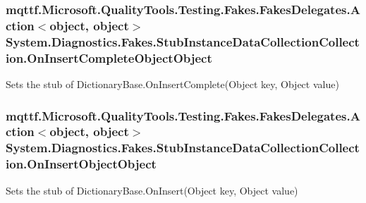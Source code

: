 \hypertarget{class_system_1_1_diagnostics_1_1_fakes_1_1_stub_instance_data_collection_collection_acc5087bdf8b7896be5e1d28d00ec22c1}{
\subsubsection[{On\-Insert\-Complete\-Object\-Object}]{\setlength{\rightskip}{0pt plus 5cm}mqttf.\-Microsoft.\-Quality\-Tools.\-Testing.\-Fakes.\-Fakes\-Delegates.\-Action$<$object, object$>$ System.\-Diagnostics.\-Fakes.\-Stub\-Instance\-Data\-Collection\-Collection.\-On\-Insert\-Complete\-Object\-Object}}\label{class_system_1_1_diagnostics_1_1_fakes_1_1_stub_instance_data_collection_collection_acc5087bdf8b7896be5e1d28d00ec22c1}


Sets the stub of Dictionary\-Base.\-On\-Insert\-Complete(\-Object key, Object value)

\hypertarget{class_system_1_1_diagnostics_1_1_fakes_1_1_stub_instance_data_collection_collection_af0a4715dabf6acc1436af3376aa0c81a}{
\subsubsection[{On\-Insert\-Object\-Object}]{\setlength{\rightskip}{0pt plus 5cm}mqttf.\-Microsoft.\-Quality\-Tools.\-Testing.\-Fakes.\-Fakes\-Delegates.\-Action$<$object, object$>$ System.\-Diagnostics.\-Fakes.\-Stub\-Instance\-Data\-Collection\-Collection.\-On\-Insert\-Object\-Object}}\label{class_system_1_1_diagnostics_1_1_fakes_1_1_stub_instance_data_collection_collection_af0a4715dabf6acc1436af3376aa0c81a}


Sets the stub of Dictionary\-Base.\-On\-Insert(\-Object key, Object value)

